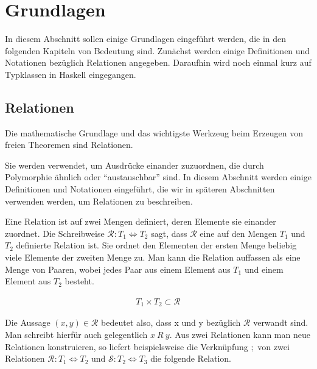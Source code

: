 \section{Grundlagen}

In diesem Abschnitt sollen einige Grundlagen eingeführt werden, die in den folgenden Kapiteln von Bedeutung sind. Zunächst werden
einige Definitionen und Notationen bezüglich Relationen angegeben. Daraufhin wird noch einmal kurz auf Typklassen in Haskell
eingegangen.


\subsection{Relationen}

Die mathematische Grundlage und das wichtigste Werkzeug beim Erzeugen von freien Theoremen sind Relationen.

Sie werden verwendet, um Ausdrücke einander zuzuordnen, die durch Polymorphie ähnlich oder ``austauschbar'' sind.
In diesem Abschnitt werden einige Definitionen und Notationen eingeführt, die wir in späteren Abschnitten verwenden werden,
um Relationen zu beschreiben. 

Eine Relation ist auf zwei Mengen definiert, deren Elemente sie einander zuordnet. Die Schreibweise
$\mathcal{R} : T_1 \Leftrightarrow T_2$ sagt, dass $\mathcal{R}$ eine auf den Mengen $T_1$ und $T_2$ definierte
Relation ist. Sie ordnet den Elementen der ersten Menge beliebig viele Elemente der zweiten Menge zu. Man kann die Relation
auffassen als eine Menge von Paaren, wobei jedes Paar aus einem Element aus $T_1$ und einem Element aus $T_2$ besteht.

\begin{align*}
T_1 \times T_2 \subset \mathcal{R}
\end{align*}

Die Aussage $(x, y) \in \mathcal{R}$ bedeutet also, dass x und y bezüglich $\mathcal{R}$ verwandt sind. Man schreibt hierfür
auch gelegentlich $x\ R\ y$. Aus zwei Relationen kann man neue Relationen konstruieren, so liefert beispielsweise die
Verknüpfung  $;$ von zwei Relationen $\mathcal{R} : T_1 \Leftrightarrow T_2$ und
$\mathcal{S} : T_2 \Leftrightarrow T_3$ die folgende Relation.

